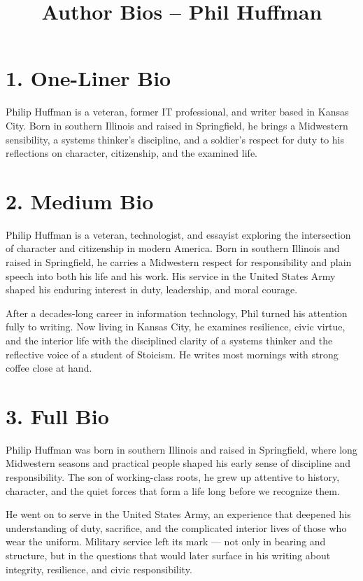 \documentclass[12pt]{article} \usepackage[margin=1in]{geometry}
\title{Author Bios -- Phil Huffman} \date{}
\begin{document}
 \maketitle

\section*{1. One-Liner Bio} 
Philip Huffman is a veteran, former IT
professional, and writer based in Kansas City. Born in southern Illinois
and raised in Springfield, he brings a Midwestern sensibility, a systems
thinker’s discipline, and a soldier’s respect for duty to his
reflections on character, citizenship, and the examined life.

\section*{2. Medium Bio} 
Philip Huffman is a veteran, technologist, and
essayist exploring the intersection of character and citizenship in
modern America. Born in southern Illinois and raised in Springfield, he
carries a Midwestern respect for responsibility and plain speech into
both his life and his work. His service in the United States Army shaped
his enduring interest in duty, leadership, and moral courage.

After a decades-long career in information technology, Phil turned his
attention fully to writing. Now living in Kansas City, he examines
resilience, civic virtue, and the interior life with the disciplined
clarity of a systems thinker and the reflective voice of a student of
Stoicism. He writes most mornings with strong coffee close at hand.

\section*{3. Full Bio} 
Philip Huffman was born in southern Illinois and
raised in Springfield, where long Midwestern seasons and practical
people shaped his early sense of discipline and responsibility. The son
of working-class roots, he grew up attentive to history, character, and
the quiet forces that form a life long before we recognize them.

He went on to serve in the United States Army, an experience that
deepened his understanding of duty, sacrifice, and the complicated
interior lives of those who wear the uniform. Military service left its
mark — not only in bearing and structure, but in the questions that
would later surface in his writing about integrity, resilience, and
civic responsibility.
\end{document}
